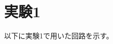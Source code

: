\documentclass{jsarticle}
\title{}
\date{}
\author{神山遼太郎}
\begin{document}
\maketitle



\section{実験1}
以下に実験1で用いた回路を示す。
\end{document}
